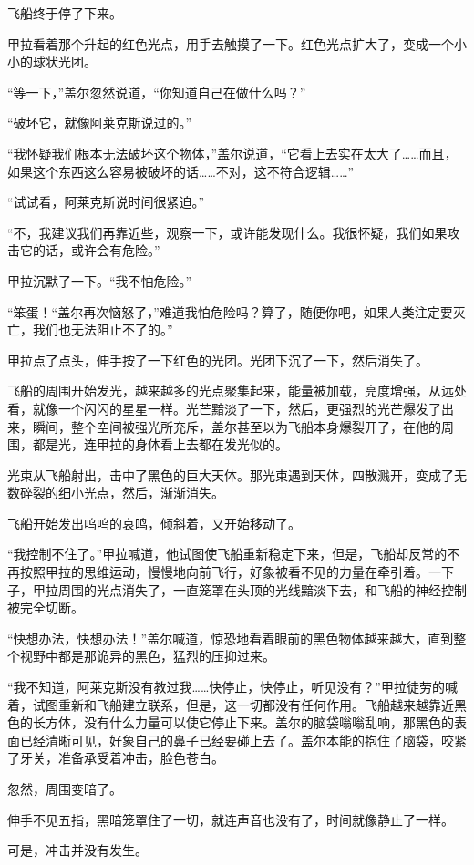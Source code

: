 飞船终于停了下来。 

甲拉看着那个升起的红色光点，用手去触摸了一下。红色光点扩大了，变成一个小小的球状光团。 

“等一下，”盖尔忽然说道，“你知道自己在做什么吗？” 

“破坏它，就像阿莱克斯说过的。” 

“我怀疑我们根本无法破坏这个物体，”盖尔说道，“它看上去实在太大了……而且，如果这个东西这么容易被破坏的话……不对，这不符合逻辑……” 

“试试看，阿莱克斯说时间很紧迫。” 

“不，我建议我们再靠近些，观察一下，或许能发现什么。我很怀疑，我们如果攻击它的话，或许会有危险。” 

甲拉沉默了一下。“我不怕危险。” 

“笨蛋！“盖尔再次恼怒了，”难道我怕危险吗？算了，随便你吧，如果人类注定要灭亡，我们也无法阻止不了的。” 

甲拉点了点头，伸手按了一下红色的光团。光团下沉了一下，然后消失了。 

飞船的周围开始发光，越来越多的光点聚集起来，能量被加载，亮度增强，从远处看，就像一个闪闪的星星一样。光芒黯淡了一下，然后，更强烈的光芒爆发了出来，瞬间，整个空间被强光所充斥，盖尔甚至以为飞船本身爆裂开了，在他的周围，都是光，连甲拉的身体看上去都在发光似的。 

光束从飞船射出，击中了黑色的巨大天体。那光束遇到天体，四散溅开，变成了无数碎裂的细小光点，然后，渐渐消失。 

飞船开始发出呜呜的哀鸣，倾斜着，又开始移动了。 

“我控制不住了。”甲拉喊道，他试图使飞船重新稳定下来，但是，飞船却反常的不再按照甲拉的思维运动，慢慢地向前飞行，好象被看不见的力量在牵引着。一下子，甲拉周围的光点消失了，一直笼罩在头顶的光线黯淡下去，和飞船的神经控制被完全切断。 

“快想办法，快想办法！”盖尔喊道，惊恐地看着眼前的黑色物体越来越大，直到整个视野中都是那诡异的黑色，猛烈的压抑过来。 

“我不知道，阿莱克斯没有教过我……快停止，快停止，听见没有？”甲拉徒劳的喊着，试图重新和飞船建立联系，但是，这一切都没有任何作用。飞船越来越靠近黑色的长方体，没有什么力量可以使它停止下来。盖尔的脑袋嗡嗡乱响，那黑色的表面已经清晰可见，好象自己的鼻子已经要碰上去了。盖尔本能的抱住了脑袋，咬紧了牙关，准备承受着冲击，脸色苍白。 

忽然，周围变暗了。 

伸手不见五指，黑暗笼罩住了一切，就连声音也没有了，时间就像静止了一样。 

可是，冲击并没有发生。 

